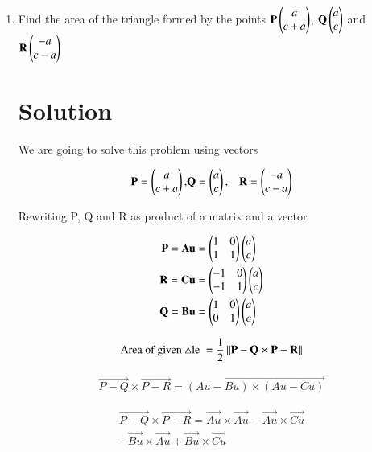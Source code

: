 \documentclass[journal,12pt,twocolumn]{IEEEtran}
\renewcommand\thesection{\arabic{section}}
\begin{document}
\begin{enumerate}[label=\thesection.\arabic*.,ref=\thesection.\theenumi]

\item Find the area of the triangle formed by the points $ \mathbf{P} \begin{pmatrix}a\\c+a\end{pmatrix}$, $\mathbf{Q} \begin{pmatrix}a\\c\end{pmatrix}$ and $\mathbf{R} \begin{pmatrix}-a\\c-a\end{pmatrix}$

\section{Solution}
We are going to solve this problem using vectors

\begin{align}
\mathbf{P}=\begin{pmatrix}a\\c+a\end{pmatrix},&\mathbf{Q} =\begin{pmatrix}a\\c\end{pmatrix},&\mathbf{R} =\begin{pmatrix}-a\\c-a\end{pmatrix}
\label{3}
\end{align}

Rewriting P, Q and R as product of a matrix and a vector

\begin{align}
\mathbf{P}=\mathbf{Au}&=\begin{pmatrix}1&0\\1&1\end{pmatrix}\begin{pmatrix}a\\c\end{pmatrix}\\
\mathbf{R}=\mathbf{Cu}&=\begin{pmatrix}-1&0\\-1&1\end{pmatrix}\begin{pmatrix}a\\c\end{pmatrix}\\
\mathbf{Q}=\mathbf{Bu}&=\begin{pmatrix}1&0\\0&1\end{pmatrix}\begin{pmatrix}a\\c\end{pmatrix}
\end{align}


\begin{multline}
\text{Area of given $\triangle$le }=\frac{1}{2}\norm{\Vec{P-Q}\times\Vec{P-R}}
\label{1}
\end{multline}

\begin{multline}
\Vec{P-Q}\times  \Vec{P-R} = \vec{(Au-Bu)\times(Au-Cu)}
\end{multline}

\begin{multline}
\Vec{P-Q}\times  \Vec{P-R}=\vec{Au}\times\vec{Au}-\vec{Au}\times\vec{Cu}\\
-\vec{Bu}\times\vec{Au}+\vec{Bu}\times\vec{Cu}
\end{multline}


\end{enumerate}
\end{document}
